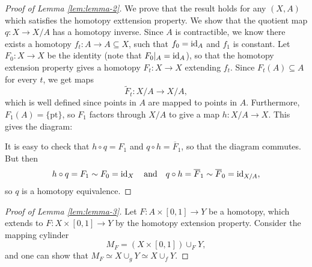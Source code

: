 \begin{proof}[Proof of Lemma \ref{lem:lemma-2}]
  We prove that the result holds for any $(X, A)$
  which satisfies the homotopy exttension property.
  We show that the quotient map $q : X \to X / A$
  has a homotopy inverse. Since $A$ is contractible,
  we know there exists a homotopy $f_t : A \to A \subseteq X$,
  such that $f_0 = \operatorname{id}_A$ and $f_1$ is constant.
  Let $F_0 : X \to X$ be the identity (note that
  $F_0|_A = \operatorname{id}_A$), so that the homotopy extension
  property gives a homotopy
  $F_t : X \to X$ extending $f_t$.
  Since $F_t(A) \subseteq A$ for every $t$, we get maps
  \[
    \widetilde{F}_t : X / A \to X / A,
  \]
  which is well defined since points in $A$ are mapped
  to points in $A$. Furthermore, $F_1(A) = \{\text{pt}\}$,
  so $F_1$ factors through $X / A$ to give a map
  $h : X / A \to X$. This gives the diagram:
  \begin{center}
  \end{center}
  It is easy to check that $h \circ q = F_1$ and
  $q \circ h = \overline{F}_1$, so that the
  diagram commutes. But then
  \[
    h \circ q = F_1 \sim F_0 = \operatorname{id}_X \quad \text{and} \quad
    q \circ h = \overline{F}_1 \sim \overline{F}_0 = \operatorname{id}_{X / A},
  \]
  so $q$ is a homotopy equivalence.
\end{proof}

\begin{proof}[Proof of Lemma \ref{lem:lemma-3}]
  Let $F : A \times [0, 1] \to Y$ be a homotopy,
  which extends to $F : X \times [0, 1] \to Y$
  by the homotopy extension property. Consider
  the mapping cylinder
  \[
    M_F = (X \times [0, 1]) \cup_F Y,
  \]
  and one can show that
  $M_F \simeq X \cup_g Y \simeq X \cup_f Y$.
\end{proof}
